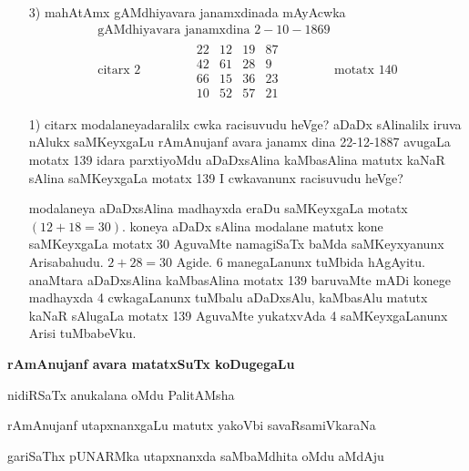 \begin{enumerate}
{\rm 4} neV vagaRda mAyAcwkada racane
$A, B, C, D$ matutx $P, Q, R, S$ beVre beVre dhana pUNaRMkagaLAgirali Aga keLage koTiTxruva mAyAcwkavu meVlina akaSxragaLige yAvudeV dhana pUNARMka bele koTaTxrU sari hoVguva pUNARMka mAyA cwkavAgirutatxde.
$$
\begin{matrix}
A+P & D+S & C+Q & B+R\\
C+R & B+Q & A+S & D+P\\
B+S & C+P & D+R & A+Q\\
D+Q & A+R & B+P & C+S
\end{matrix}
$$

\item[{\rm 3)}] mahAtAmx gAMdhiyavara janamxdinada mAyAcwka
\begin{gather*}
\text{gAMdhiyavara janamxdina }  2-10-1869\\
\text{citarx } 2 \qquad \qquad 
\begin{matrix}
22 & 12 & 19 & 87\\
42 & 61 & 28 & 9\\
66 & 15 & 36 & 23\\
10 & 52 & 57 & 21
\end{matrix} \qquad \qquad 
\text{motatx } 140
\end{gather*}

\item[{\rm 1)}] citarx modalaneyadaralilx cwka racisuvudu heVge? aDaDx sAlinalilx iruva nAlukx saMKeyxgaLu rAmAnujanf avara janamx dina {\rm 22-12-1887} avugaLa motatx {\rm 139} idara parxtiyoMdu aDaDxsAlina kaMbasAlina matutx kaNaR sAlina saMKeyxgaLa motatx {\rm 139} I cwkavanunx racisuvudu heVge? 

modalaneya aDaDxsAlina madhayxda eraDu saMKeyxgaLa motatx $(12+18=30).$ koneya aDaDx sAlina modalane matutx kone saMKeyxgaLa motatx {\rm 30} AguvaMte namagiSaTx baMda saMKeyxyanunx Arisabahudu. $2+28=30$ Agide. {\rm 6} manegaLanunx tuMbida hAgAyitu. anaMtara aDaDxsAlina kaMbasAlina motatx {\rm 139} baruvaMte mADi konege madhayxda {\rm 4} cwkagaLanunx tuMbalu aDaDxsAlu, kaMbasAlu matutx kaNaR sAlugaLa motatx {\rm 139} AguvaMte yukatxvAda {\rm 4} saMKeyxgaLanunx Arisi tuMbabeVku.
\end{enumerate}

\textbf{rAmAnujanf avara matatxSuTx koDugegaLu}

nidiRSaTx anukalana oMdu PalitAMsha

rAmAnujanf utapxnanxgaLu matutx yakoVbi savaRsamiVkaraNa

gariSaThx pUNARMka utapxnanxda saMbaMdhita oMdu aMdAju

